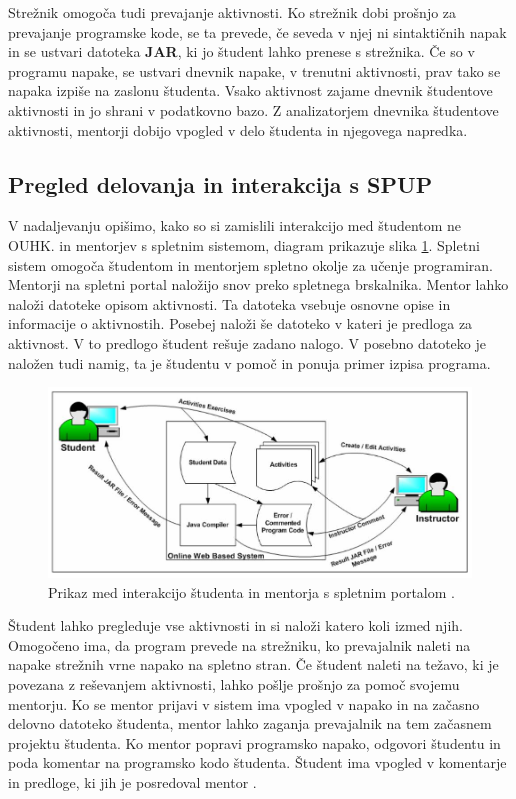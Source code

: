 Strežnik omogoča tudi prevajanje aktivnosti. Ko strežnik dobi prošnjo
za prevajanje programske kode, se ta prevede, če seveda v njej ni
sintaktičnih napak in se ustvari datoteka \textbf{JAR}, ki jo študent
lahko prenese s strežnika. Če so v programu napake, se ustvari dnevnik
napake, v trenutni aktivnosti, prav tako se napaka izpiše na zaslonu
študenta. Vsako aktivnost zajame dnevnik študentove aktivnosti in jo shrani v
podatkovno bazo. Z analizatorjem dnevnika študentove aktivnosti,
mentorji dobijo vpogled v delo študenta in njegovega napredka.


\subsection{Pregled delovanja in interakcija s SPUP}
\label{sec:pregled_delovanja_in_interakcija}

V nadaljevanju opišimo, kako so si zamislili interakcijo med študentom
ne OUHK.  in mentorjev s spletnim sistemom, diagram prikazuje slika
\ref{fig:OUHK_workFlow}. Spletni sistem omogoča študentom in mentorjem
spletno okolje za učenje programiran. Mentorji na spletni portal
naložijo snov preko spletnega brskalnika. Mentor lahko naloži datoteke
opisom aktivnosti. Ta datoteka vsebuje osnovne opise in informacije o
aktivnostih. Posebej naloži še datoteko v kateri je predloga za
aktivnost. V to predlogo študent rešuje zadano nalogo. V posebno
datoteko je naložen tudi namig, ta je študentu v pomoč in ponuja
primer izpisa programa.

\begin{figure}[htb!] \centering
  \includegraphics[width=0.9\linewidth, keepaspectratio =
1]{./images/SystemArch02_OUHK_DistanceEdu.jpg}
\caption{Prikaz med interakcijo študenta in mentorja s spletnim
  portalom \cite{ITaLCP_DistanceEdu}.}
  \label{fig:OUHK_workFlow}
\end{figure}

Študent lahko pregleduje vse aktivnosti in si naloži katero koli izmed
njih. Omogočeno ima, da program prevede na strežniku, ko prevajalnik
naleti na napake strežnih vrne napako na spletno stran. Če študent
naleti na težavo, ki je povezana z reševanjem aktivnosti, lahko pošlje
prošnjo za pomoč svojemu mentorju. Ko se mentor prijavi v sistem ima
vpogled v napako in na začasno delovno datoteko študenta, mentor lahko
zaganja prevajalnik na tem začasnem projektu študenta. Ko mentor
popravi programsko napako, odgovori študentu in poda komentar na
programsko kodo študenta. Študent ima vpogled v komentarje in
predloge, ki jih je posredoval mentor \cite{ITaLCP_DistanceEdu}.


